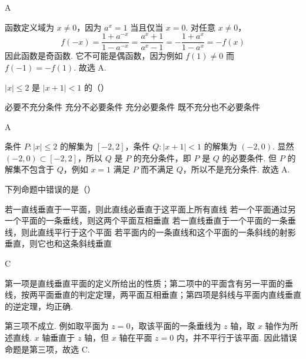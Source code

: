 \documentclass[UTF8,a4paper,oneside,11pt]{ctexbook}
\begin{document}
\begin{answer}
A
\end{answer}

\begin{solution}
函数定义域为 \(x\ne0\)，因为 \(a^x=1\) 当且仅当 \(x=0\). 对任意 \(x\ne0\)，
\[
f(-x)=\frac{1+a^{-x}}{1-a^{-x}}=\frac{a^x+1}{a^x-1}=-\frac{1+a^x}{1-a^x}=-f(x)
\]
因此函数是奇函数. 它不可能是偶函数，因为例如 \(f(1)\ne0\) 而 \(f(-1)=-f(1)\). 故选 A.
\end{solution}

\begin{problem}
\(|x|\leqslant2\) 是 \(|x+1|<1\) 的（\quad）

\choices
    {必要不充分条件}
    {充分不必要条件}
    {充分必要条件}
    {既不充分也不必要条件}
\end{problem}

\begin{answer}
A
\end{answer}

\begin{solution}
条件 \(P:|x|\leqslant2\) 的解集为 \([-2,2]\)，条件 \(Q:|x+1|<1\) 的解集为 \((-2,0)\). 显然 \((-2,0)\subset[-2,2]\)，所以 \(Q\) 是 \(P\) 的充分条件，即 \(P\) 是 \(Q\) 的必要条件. 但 \(P\) 的解集不包含于 \(Q\)，例如 \(x=1\) 满足 \(P\) 而不满足 \(Q\)，所以不是充分条件. 故选 A.
\end{solution}

\begin{problem}
下列命题中错误的是（\quad）

\choices
    {若一直线垂直于一平面，则此直线必垂直于这平面上所有直线}
    {若一个平面通过另一个平面的一条垂线，则这两个平面互相垂直}
    {若一直线垂直于一个平面的一条垂线，则此直线平行于这个平面}
    {若平面内的一条直线和这个平面的一条斜线的射影垂直，则它也和这条斜线垂直}
\end{problem}

\begin{answer}
C
\end{answer}

\begin{solution}
第一项是直线垂直平面的定义所给出的性质；第二项中的平面含有另一平面的垂线，按两平面垂直的判定定理，两平面互相垂直；第四项是斜线与平面内直线垂直的逆定理，均正确.

第三项不成立. 例如取平面为 \(z=0\)，取该平面的一条垂线为 \(z\) 轴，取 \(x\) 轴作为所述直线. \(x\) 轴垂直于 \(z\) 轴，但 \(x\) 轴在平面 \(z=0\) 内，并不平行于该平面. 因此错误命题是第三项，故选 C.
\end{solution}
\end{document}
